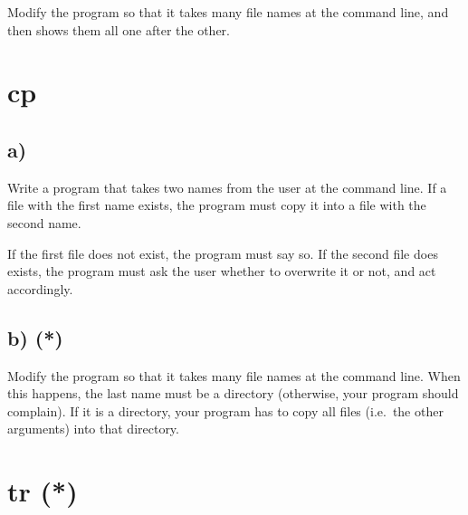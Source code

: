 \documentclass{article}
\begin{document}
Modify the program so that it takes many file names at the command
line, and then shows them all one after the other. 

\section{cp}
\label{sec:cp}

\subsection*{a) }
\label{sec}

Write a program that takes two names from the user at the command
line. If a file with the first name exists, the program must copy it
into a file with the second name. 

If the first file does not exist, the program must say so. If the
second file does exists, the program must ask the user whether to
overwrite it or not, and act accordingly.

%

\subsection*{b) (*)}
\label{sec:brr}

Modify the program so that it takes many file names at the command
line. When this happens, the last name must be a directory (otherwise,
your program should complain). If it is a directory, your program has
to copy all files (i.e.~the other arguments) into that directory. 

\section{tr (*)}
\label{sec:tr}
\end{document}
